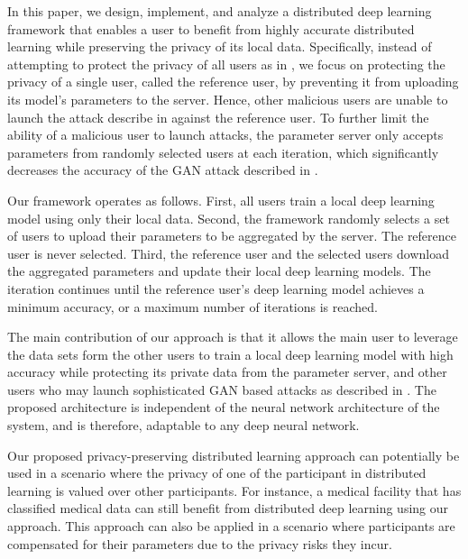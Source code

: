 \documentclass[letterpaper]{article}
\begin{document}
\begin{flushleft}
{In this paper, we design, implement, and analyze a distributed deep learning framework that enables a user 
to benefit from highly accurate distributed learning while preserving the privacy of its local data. 
Specifically,  instead of attempting to protect the privacy of all users as in \cite{shokri2015privacy}, we focus on protecting the
privacy of a single user, called the reference user, by preventing it from uploading its model's parameters to the server. Hence,
other malicious users are unable to launch the attack describe in \cite{hitaj2017deep} against the reference user. To further limit the
ability of a malicious user to launch attacks, the parameter server only accepts parameters from randomly
selected users at each iteration, which significantly decreases the accuracy of the GAN attack described in \cite{hitaj2017deep}. 

Our framework operates as follows. First, all users train a local deep learning model using only their local data.
Second, the framework randomly selects a set of users to upload their parameters to be aggregated by the server. The reference user is
never selected. Third, the reference user and the selected users download the aggregated parameters and update their local
deep learning models. The iteration continues until the reference user's deep learning model achieves a minimum
accuracy, or a maximum number of iterations is reached.

The main contribution of our approach is that it allows the main user to leverage the data sets form the other users to train a local
deep learning model with high accuracy while protecting its private data from the parameter server, and other users who
may launch sophisticated GAN based attacks as described in \cite{hitaj2017deep}. The proposed architecture is independent of the
neural network architecture of the system, and is therefore, adaptable to any deep neural network. 

Our proposed privacy-preserving
distributed learning approach can potentially be used in a scenario where the privacy of one of the participant in distributed learning is valued over other participants. For instance, a medical facility that has classified medical data can still benefit from distributed deep learning using our approach.
This approach can also be applied in a scenario where participants are compensated for their parameters due to the privacy risks they incur. 


}
\end{flushleft}
\end{document}
